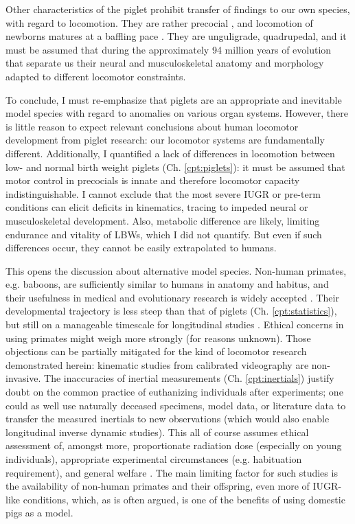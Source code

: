 Other characteristics of the piglet prohibit transfer of findings to our own species, with regard to locomotion.
They are rather precocial \citep{Wischner2009,JYoung2023}, and locomotion of newborns matures at a baffling pace \citep{VandenHole2017,VandenHole2018}.
They are unguligrade, quadrupedal, and it must be assumed that during the approximately 94 million years of evolution that separate us \citep{Timetree2017} their neural and musculoskeletal anatomy and morphology adapted to different locomotor constraints.


To conclude, I must re-emphasize that piglets are an appropriate and inevitable model species with regard to anomalies on various organ systems.
However, there is little reason to expect relevant conclusions about human locomotor development from piglet research: our locomotor systems are fundamentally different.
Additionally, I quantified a lack of differences in locomotion between low- and normal birth weight piglets (Ch. \ref{cpt:piglets}): it must be assumed that motor control in precocials is innate and therefore locomotor capacity indistinguishable.
I cannot exclude that the most severe IUGR or pre-term conditions can elicit deficits in kinematics, tracing to impeded neural or musculoskeletal development.
Also, metabolic difference are likely, limiting endurance and vitality of LBWs, which I did not quantify.
But even if such differences occur, they cannot be easily extrapolated to humans.


This opens the discussion about alternative model species.
Non-human primates, e.g. baboons, are sufficiently similar to humans in anatomy and habitus, and their usefulness in medical and evolutionary research is widely accepted \citep{Nardone2017,Liang2023,Aerts2023b,Druelle2021,BoulinguezAmbroise2021}.
Their developmental trajectory is less steep than that of piglets (Ch. \ref{cpt:statistics}), but still on a manageable timescale for longitudinal studies \citep{Druelle2017}.
Ethical concerns in using primates might weigh more strongly (for reasons unknown).
Those objections can be partially mitigated for the kind of locomotor research demonstrated herein:
kinematic studies from calibrated videography are non-invasive.
The inaccuracies of inertial measurements (Ch. \ref{cpt:inertials}) justify doubt on the common practice of euthanizing individuals after experiments; one could as well use naturally deceased specimens, model data, or literature data to transfer the measured inertials to new observations (which would also enable longitudinal inverse dynamic studies).
This all of course assumes ethical assessment of, amongst more, proportionate radiation dose (especially on young individuals), appropriate experimental circumstances (e.g. habituation requirement), and general welfare \citep{Young2018}.
The main limiting factor for such studies is the availability of non-human primates and their offspring, even more of IUGR-like conditions, which, as is often argued, is one of the benefits of using domestic pigs as a model.

